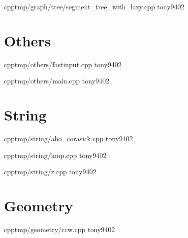 {}
{}
{}
{cpp}{tmp/graph/tree/segment_tree_with_lazy.cpp}
{tony9402}


\section{Others}


{}
{}
{}
{cpp}{tmp/others/fastinput.cpp}
{tony9402}



{}
{}
{}
{cpp}{tmp/others/main.cpp}
{tony9402}


\section{String}


{}
{}
{}
{cpp}{tmp/string/aho_corasick.cpp}
{tony9402}



{}
{}
{}
{cpp}{tmp/string/kmp.cpp}
{tony9402}



{}
{}
{}
{cpp}{tmp/string/z.cpp}
{tony9402}


\section{Geometry}


{}
{}
{}
{cpp}{tmp/geometry/ccw.cpp}
{tony9402}

